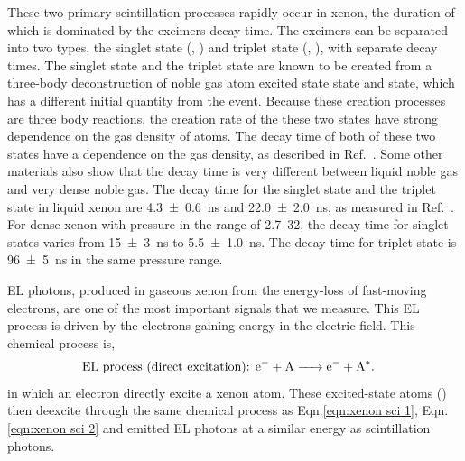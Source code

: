 These two primary scintillation processes rapidly occur in xenon, the duration of which is dominated by the excimers decay time. The excimers can be separated into two types, the singlet state (, ) and triplet state (, ), with separate decay times. The singlet state and the triplet state are known to be created from a three-body deconstruction of noble gas atom excited state  state and  state, which has a different initial quantity from the event. Because these creation processes are three body reactions, the creation rate of the these two states have strong dependence on the gas density of atoms. The decay time of both of these two states have a dependence on the gas density, as described in  Ref.~\cite{Keto1974}. Some other materials also show that the decay time is very different between liquid noble gas and very dense noble gas. The decay time for the singlet state and the triplet state in liquid xenon are \SI[separate-uncertainty=false]{4.3 \pm 0.6}{\ns}  and \SI[separate-uncertainty=false]{22.0 \pm 2.0}{\ns}, as measured in Ref.~\cite{Hitachi1983}. For dense xenon with pressure in the range of \SIrange{2.7}{32}{\atm}, the decay time for singlet states varies from \SI[separate-uncertainty=false]{15 \pm 3}{\ns} to \SI[separate-uncertainty=false]{5.5 \pm 1.0}{\ns}. The decay time for triplet state is \SI[separate-uncertainty=false]{96 \pm 5}{\ns} in the same pressure range.


EL photons, produced in gaseous xenon from the energy-loss of fast-moving electrons, are one of the most important signals that we measure. This EL process is driven by the electrons gaining energy in the electric field. This chemical process is,
\begin{align}
\text{EL process (direct excitation): } &\ce{e^- + A -> e^- + A^*} .
\end{align}
in which an electron directly excite a xenon atom. These excited-state atoms () then deexcite through the same chemical process as Eqn.\ref{eqn:xenon sci 1}, Eqn.\ref{eqn:xenon sci 2} and emitted EL photons at a similar energy as scintillation photons. 

